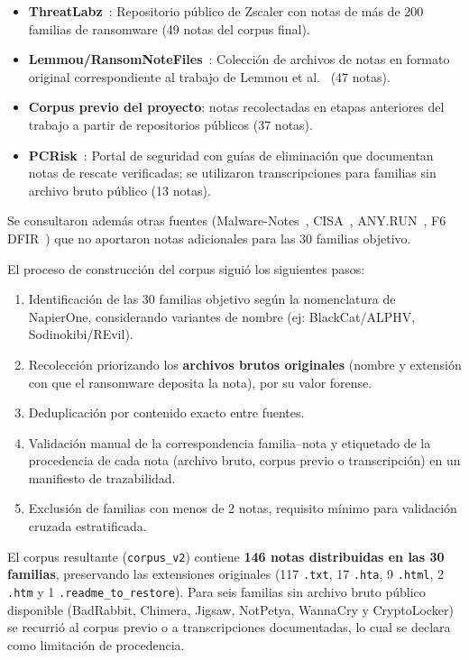 \begin{itemize}
    \item \textbf{ThreatLabz}~\cite{threatlabz}: Repositorio público de Zscaler con notas de más de 200 familias de ransomware (49 notas del corpus final).
    \item \textbf{Lemmou/RansomNoteFiles}~\cite{paper_5_dataset}: Colección de archivos de notas en formato original correspondiente al trabajo de Lemmou et al.~\cite{paper_5_note_files} (47 notas).
    \item \textbf{Corpus previo del proyecto}: notas recolectadas en etapas anteriores del trabajo a partir de repositorios públicos (37 notas).
    \item \textbf{PCRisk}~\cite{pcrisk}: Portal de seguridad con guías de eliminación que documentan notas de rescate verificadas; se utilizaron transcripciones para familias sin archivo bruto público (13 notas).
\end{itemize}

Se consultaron además otras fuentes (Malware-Notes~\cite{malwarenotes_repo}, CISA~\cite{cisa_stopransomware}, ANY.RUN~\cite{anyrun_sandbox}, F6 DFIR~\cite{f6dfir_ransomware}) que no aportaron notas adicionales para las 30 familias objetivo.

El proceso de construcción del corpus siguió los siguientes pasos:

\begin{enumerate}
    \item Identificación de las 30 familias objetivo según la nomenclatura de NapierOne, considerando variantes de nombre (ej: BlackCat/ALPHV, Sodinokibi/REvil).
    \item Recolección priorizando los \textbf{archivos brutos originales} (nombre y extensión con que el ransomware deposita la nota), por su valor forense.
    \item Deduplicación por contenido exacto entre fuentes.
    \item Validación manual de la correspondencia familia--nota y etiquetado de la procedencia de cada nota (archivo bruto, corpus previo o transcripción) en un manifiesto de trazabilidad.
    \item Exclusión de familias con menos de 2 notas, requisito mínimo para validación cruzada estratificada.
\end{enumerate}

El corpus resultante (\texttt{corpus\_v2}) contiene \textbf{146 notas distribuidas en las 30 familias}, preservando las extensiones originales (117 \texttt{.txt}, 17 \texttt{.hta}, 9 \texttt{.html}, 2 \texttt{.htm} y 1 \texttt{.readme\_to\_restore}). Para seis familias sin archivo bruto público disponible (BadRabbit, Chimera, Jigsaw, NotPetya, WannaCry y CryptoLocker) se recurrió al corpus previo o a transcripciones documentadas, lo cual se declara como limitación de procedencia.

